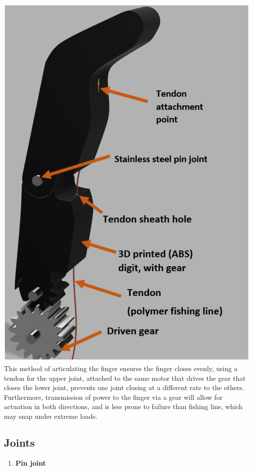 \documentclass[12pt,3p]{report}
\begin{document}
\begin{multicols}{2}
\begin{enumerate}
{				\includegraphics[scale=0.5]{gear.PNG}
				This method of articulating the finger ensures the finger closes evenly, using a tendon for the upper joint, attached to the same motor that drives the gear that closes the lower joint, prevents one joint closing at a different rate to the others. Furthermore, transmission of power to the finger via a gear will allow for actuation in both directions, and is less prone to failure than fishing line, which may snap under extreme loads.
			}		
			\end{enumerate}
			
		\subsection{Joints}
		
		\begin{enumerate}
		\item \textbf{Pin joint} {
		
}
\end{enumerate}
\end{multicols}
\end{document}
